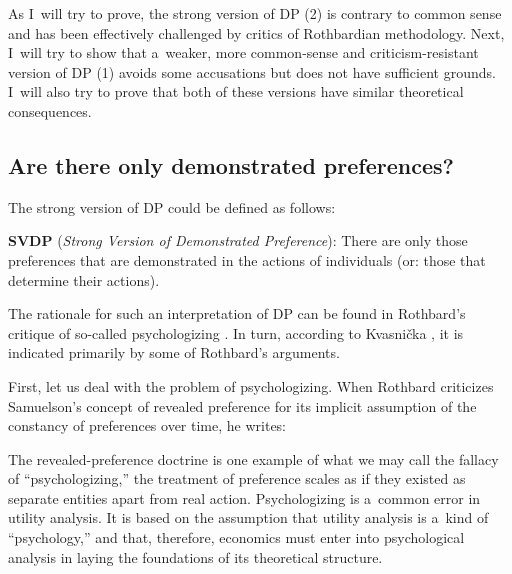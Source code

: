 As I~will try to prove, the strong version of DP (2) is contrary to common sense and has been effectively challenged by critics of Rothbardian methodology. Next, I~will try to show that a~weaker, more common-sense and criticism-resistant version of DP (1) avoids some accusations but does not have sufficient grounds. I~will also try to prove that both of these versions have similar theoretical consequences.



\subsection{Are there only demonstrated preferences?}



The strong version of DP could be defined as follows:



\textbf{SVDP} (\textit{Strong Version of Demonstrated Preference}): There are only those preferences that are demonstrated in the actions of individuals (or: those that determine their actions).



The rationale for such an interpretation of DP can be found in Rothbard's critique of so-called psychologizing 
\parencite[][pp.296–298]{rothbard_present_2011}. %
 In turn, according to Kvasnička 
\parencite*[][]{kvasnicka_rothbards_2008}, %
 it is indicated primarily by some of Rothbard's arguments.



First, let us deal with the problem of psychologizing. When Rothbard criticizes Samuelson's concept of revealed preference for its implicit assumption of the constancy of preferences over time, he writes:



The revealed-preference doctrine is one example of what we may call the fallacy of ``psychologizing,'' the treatment of preference scales as if they existed as separate entities apart from real action. Psychologizing is a~common error in utility analysis. It is based on the assumption that utility analysis is a~kind of ``psychology,'' and that, therefore, economics must enter into psychological analysis in laying the foundations of its theoretical structure. 
\parencite[][p.296]{rothbard_present_2011}%




